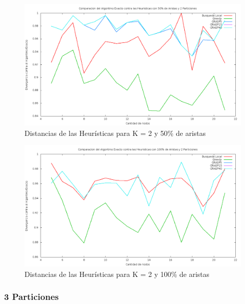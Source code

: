 \begin{figure}[H]
\begin{center}
\includegraphics[scale=0.3]{finales/ComparacionesCon2Particiones50Aristas.png}
\caption{Distancias de las Heur\'isticas para K = 2 y 50\% de aristas}
\end{center}
\end{figure}

\begin{figure}[H]
\begin{center}
\includegraphics[scale=0.3]{finales/ComparacionesCon2Particiones100Aristas.png}
\caption{Distancias de las Heur\'isticas para K = 2 y 100\% de aristas}
\end{center}
\end{figure}

\subsubsection{3 Particiones}

